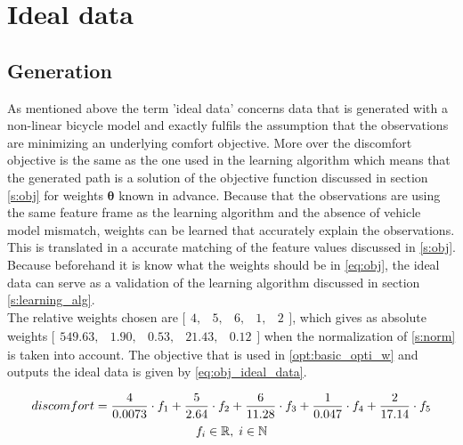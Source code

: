 \section{Ideal data} \label{s:GD}
\subsection{Generation}
As mentioned above the term 'ideal data' concerns data that is generated with a non-linear bicycle model and exactly fulfils the assumption that the observations are minimizing an underlying comfort objective. More over the discomfort objective is the same as the one used in the learning algorithm which means that the generated path is a solution of the objective function discussed in section \ref{s:obj} for weights $\bm{\theta}$ known in advance. Because that the observations are using the same feature frame as the learning algorithm and the absence of vehicle model mismatch, weights can be learned that accurately explain the observations. This is translated in a accurate matching of the feature values discussed in \ref{s:obj}. Because beforehand it is know what the weights should be in \ref{eq:obj}, the ideal data can serve as a validation of the learning algorithm discussed in section \ref{s:learning_alg}.\\

The relative weights chosen are $ \bigl[ \begin{smallmatrix} 4,&5,&6,&1,&2\end{smallmatrix}\bigr]$, which gives as absolute weights  $ \bigl[ \begin{smallmatrix} 549.63, &1.90, &0.53,  &21.43, &0.12\end{smallmatrix}\bigr]$ when the normalization of \ref{s:norm} is taken into account. The objective that is used in \ref{opt:basic_opti_w} and outputs the ideal data is given by \ref{eq:obj_ideal_data}.

\begin{equation}\label{eq:obj_ideal_data}
discomfort = \frac{4}{0.0073} \cdot f_1 +\frac{5}{2.64} \cdot f_2 +\frac{6}{11.28} \cdot f_3 +\frac{1}{0.047} \cdot f_4 +\frac{2}{17.14} \cdot f_5 \\
\end{equation}
\[	f_i \in \mathbb{R}, \hspace{1mm}
i \in \mathbb{N}\]\\

